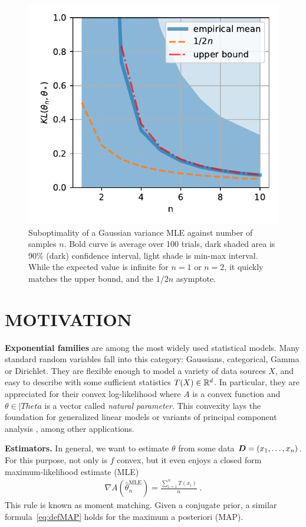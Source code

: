 \documentclass[twoside]{article}
\let\oldsection\section
\renewcommand{\section}[1]{\oldsection{\texorpdfstring{\uppercase{#1}}{#1}}}
\newcommand{\logpart}{A}
\newcommand{\nat}{\theta}
\newcommand{\lin}[1]{\left\langle#1\right\rangle}
\begin{document}
\begin{figure}[t]
	\centering
\includegraphics[width=.4\textwidth]{fewsamples.pdf}
	\caption{Suboptimality of a Gaussian variance MLE against number of samples $n$. Bold curve is average over 100 trials,  dark shaded area is 90\% (dark) confidence interval, light shade is min-max interval.
		While the expected value is infinite for $n=1$ or $n=2$, it quickly matches the upper bound, and the $1/2n$ asymptote.
	}
	\label{fig:curves}
\end{figure}


\section{Motivation}
\label{sec:motivation}

{\bf Exponential families} are among the most widely used statistical models.
Many standard random variables fall into this category: Gaussians, categorical, Gamma or Dirichlet.
They are flexible enough to model a variety of data sources $X$, and easy to describe with some sufficient statistics $T(X) \in \mathbb{R}^d$.
In particular, they are appreciated for their convex log-likelihood
\alignn{
f(\nat) = \E[-\log p_\nat(X)] = \logpart(\nat) - \lin{\E[T(X)] , \nat},
\label{eq:defNLL}
}
where $\logpart$ is a convex function and $\nat\in|Theta$ is a vector called \textit{natural parameter}.
This convexity lays the foundation for generalized linear models \citep{mccullagh1989generalized}
or variants of principal component analysis \citep{collins2001generalization}, among other applications.

{\bf Estimators.}
In general, we want to estimate $\nat$ from some data ${\bm{D}} = (x_1, \dots, x_n)$.
For this purpose, not only is $f$ convex, but it even enjoys a closed form maximum-likelihood estimate (MLE)
\begin{align}
	\nabla \logpart(\hat \nat_n^\text{MLE}) = \frac{\sum_{i=1}^n T(x_i)}{n} \; .
	\label{eq:defMLE}
\end{align}
This rule is known as moment matching.
Given a conjugate prior, a similar formula~\eqref{eq:defMAP} holds for the maximum a posteriori (MAP).
\end{document}
